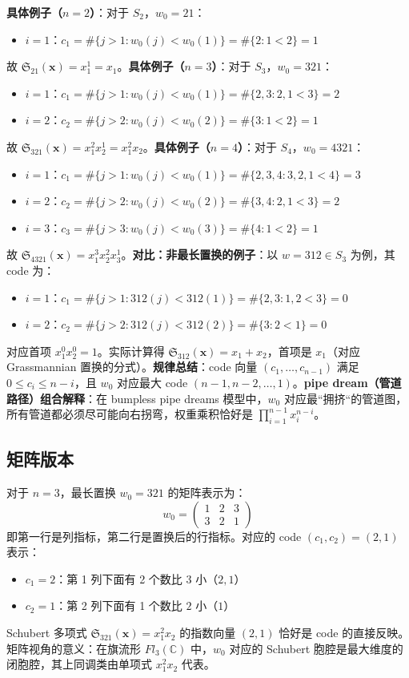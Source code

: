 \textbf{具体例子（$n=2$）}：对于 $S_2$，$w_0 = 21$：
\begin{itemize}
\item $i=1$：$c_1 = \#\{j > 1 : w_0(j) < w_0(1)\} = \#\{2 : 1 < 2\} = 1$
\end{itemize}故 $\mathfrak{S}_{21}(\mathbf{x}) = x_1^1 = x_1$。\bigskip\textbf{具体例子（$n=3$）}：对于 $S_3$，$w_0 = 321$：
\begin{itemize}
\item $i=1$：$c_1 = \#\{j > 1 : w_0(j) < w_0(1)\} = \#\{2,3 : 2,1 < 3\} = 2$\item $i=2$：$c_2 = \#\{j > 2 : w_0(j) < w_0(2)\} = \#\{3 : 1 < 2\} = 1$
\end{itemize}故 $\mathfrak{S}_{321}(\mathbf{x}) = x_1^2 x_2^1 = x_1^2 x_2$。\bigskip\textbf{具体例子（$n=4$）}：对于 $S_4$，$w_0 = 4321$：
\begin{itemize}
\item $i=1$：$c_1 = \#\{j > 1 : w_0(j) < w_0(1)\} = \#\{2,3,4 : 3,2,1 < 4\} = 3$\item $i=2$：$c_2 = \#\{j > 2 : w_0(j) < w_0(2)\} = \#\{3,4 : 2,1 < 3\} = 2$\item $i=3$：$c_3 = \#\{j > 3 : w_0(j) < w_0(3)\} = \#\{4 : 1 < 2\} = 1$
\end{itemize}故 $\mathfrak{S}_{4321}(\mathbf{x}) = x_1^3 x_2^2 x_3^1$。\bigskip\textbf{对比：非最长置换的例子}：以 $w = 312 \in S_3$ 为例，其 code 为：
\begin{itemize}
\item $i=1$：$c_1 = \#\{j > 1 : 312(j) < 312(1)\} = \#\{2,3 : 1,2 < 3\} = 0$\item $i=2$：$c_2 = \#\{j > 2 : 312(j) < 312(2)\} = \#\{3 : 2 < 1\} = 0$
\end{itemize}对应首项 $x_1^0 x_2^0 = 1$。实际计算得 $\mathfrak{S}_{312}(\mathbf{x}) = x_1 + x_2$，首项是 $x_1$（对应 Grassmannian 置换的分式）。\textbf{规律总结}：code 向量 $(c_1, \ldots, c_{n-1})$ 满足 $0 \leq c_i \leq n-i$，且 $w_0$ 对应最大 code $(n-1, n-2, \ldots, 1)$。\textbf{pipe dream（管道路径）组合解释}：在 bumpless pipe dreams 模型中，$w_0$ 对应最``拥挤``的管道图，所有管道都必须尽可能向右拐弯，权重乘积恰好是 $\prod_{i=1}^{n-1} x_i^{n-i}$。\subsection*{矩阵版本}\label{sec:InitialConditionMatrix}对于 $n=3$，最长置换 $w_0 = 321$ 的矩阵表示为：$$w_0 = 
\begin{pmatrix} 1 & 2 & 3 \\ 3 & 2 & 1 
\end{pmatrix}$$即第一行是列指标，第二行是置换后的行指标。对应的 code $(c_1, c_2) = (2, 1)$ 表示：
\begin{itemize}
\item $c_1 = 2$：第 1 列下面有 2 个数比 $3$ 小（$2, 1$）\item $c_2 = 1$：第 2 列下面有 1 个数比 $2$ 小（$1$）
\end{itemize}Schubert 多项式 $\mathfrak{S}_{321}(\mathbf{x}) = x_1^2 x_2$ 的指数向量 $(2, 1)$ 恰好是 code 的直接反映。矩阵视角的意义：在旗流形 $Fl_3(\mathbb{C})$ 中，$w_0$ 对应的 Schubert 胞腔是最大维度的闭胞腔，其上同调类由单项式 $x_1^2 x_2$ 代表。

